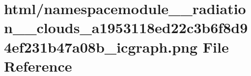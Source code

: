 \hypertarget{namespacemodule____radiation____clouds__a1953118ed22c3b6f8d94ef231b47a08b__icgraph_8png}{}\section{html/namespacemodule\+\_\+\+\_\+radiation\+\_\+\+\_\+clouds\+\_\+a1953118ed22c3b6f8d94ef231b47a08b\+\_\+icgraph.png File Reference}
\label{namespacemodule____radiation____clouds__a1953118ed22c3b6f8d94ef231b47a08b__icgraph_8png}
